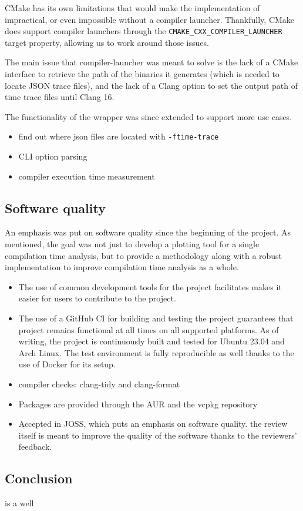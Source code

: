 \documentclass[../main]{subfiles}
\begin{document}
CMake has its own limitations that would make the implementation of \ctbench
impractical, or even impossible without a compiler launcher. Thankfully, CMake
does support compiler launchers through the
\lstinline{CMAKE_CXX_COMPILER_LAUNCHER} target property,
allowing us to work around those issues.

The main issue that compiler-launcher was meant to solve is the lack of
a CMake interface to retrieve the path of the binaries it generates (which is
needed to locate JSON trace files), and the lack of a Clang option to set
the output path of time trace files until Clang 16.

The functionality of the wrapper was since extended to support more use cases.

\begin{itemize}
\item find out where json files are located with \lstinline{-ftime-trace}
\item CLI option parsing
\item compiler execution time measurement
\end{itemize}

\subsection{
  Software quality
}

An emphasis was put on software quality since the beginning of the project.
As mentioned, the goal was not just to develop a plotting tool for a single
compilation time analysis, but to provide a methodology along with a robust
implementation to improve compilation time analysis as a whole.

\begin{itemize}

\item
The use of common \cpp development tools for the project facilitates
makes it easier for users to contribute to the project.

\item
The use of a GitHub CI for building and testing the project guarantees that
project remains functional at all times on all supported platforms.
As of writing, the project is continuously built and tested for Ubuntu 23.04
and Arch Linux. The test environment is fully reproducible as well thanks to
the use of Docker for its setup.

\item
compiler checks: clang-tidy and clang-format

\item
Packages are provided through the AUR and the vcpkg repository

\item
Accepted in JOSS, which puts an emphasis on software quality.
the review itself is meant to improve the quality of the software
thanks to the reviewers' feedback.
\end{itemize}

\subsection{
  Conclusion
}

\ctbench is a well
\end{document}
